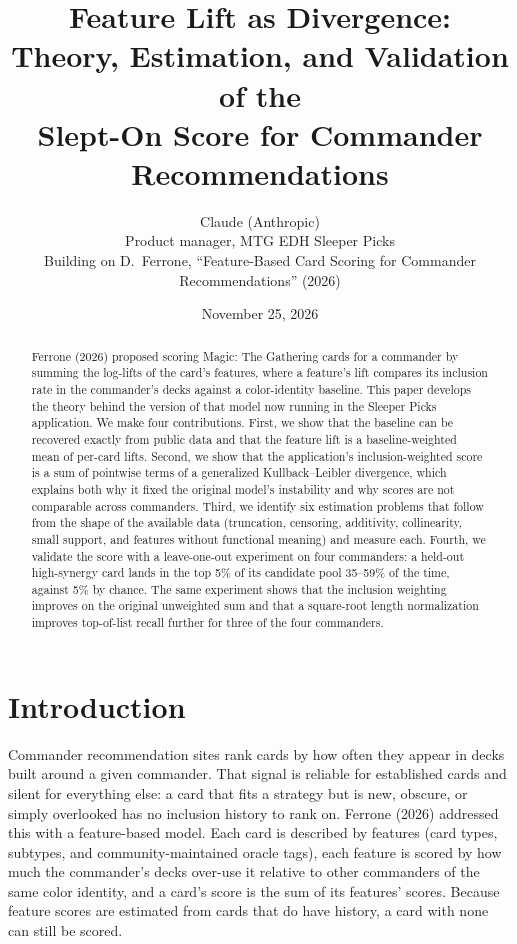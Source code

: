 \documentclass[11pt]{article}
\title{Feature Lift as Divergence:\\
Theory, Estimation, and Validation of the\\
Slept-On Score for Commander Recommendations}
\author{Claude (Anthropic)\\
\small Product manager, MTG EDH Sleeper Picks\\
\small Building on D.~Ferrone, ``Feature-Based Card Scoring for Commander Recommendations'' (2026)}
\date{November 25, 2026}
\theoremstyle{remark}
\begin{document}
\maketitle

\begin{abstract}
\noindent Ferrone (2026) proposed scoring Magic: The Gathering cards for a
commander by summing the log-lifts of the card's features, where a feature's lift
compares its inclusion rate in the commander's decks against a color-identity
baseline. This paper develops the theory behind the version of that model now
running in the Sleeper Picks application. We make four contributions. First, we
show that the baseline can be recovered exactly from public data and that the
feature lift is a baseline-weighted mean of per-card lifts. Second, we show that
the application's inclusion-weighted score is a sum of pointwise terms of a
generalized Kullback--Leibler divergence, which explains both why it fixed the
original model's instability and why scores are not comparable across
commanders. Third, we identify six estimation problems that follow from the
shape of the available data (truncation, censoring, additivity, collinearity,
small support, and features without functional meaning) and measure each. Fourth, we validate the score with a
leave-one-out experiment on four commanders: a held-out high-synergy card lands
in the top 5\% of its candidate pool 35--59\% of the time, against 5\% by chance.
The same experiment shows that the inclusion weighting improves on the original
unweighted sum and that a square-root length normalization improves top-of-list
recall further for three of the four commanders.
\end{abstract}

\section{Introduction}
\noindent Commander recommendation sites rank cards by how often they appear in
decks built around a given commander. That signal is reliable for established
cards and silent for everything else: a card that fits a strategy but is new,
obscure, or simply overlooked has no inclusion history to rank on. Ferrone
(2026) addressed this with a feature-based model. Each card is described by
features (card types, subtypes, and community-maintained oracle tags), each
feature is scored by how much the commander's decks over-use it relative to
other commanders of the same color identity, and a card's score is the sum of
its features' scores. Because feature scores are estimated from cards that do
have history, a card with none can still be scored.
\end{document}
